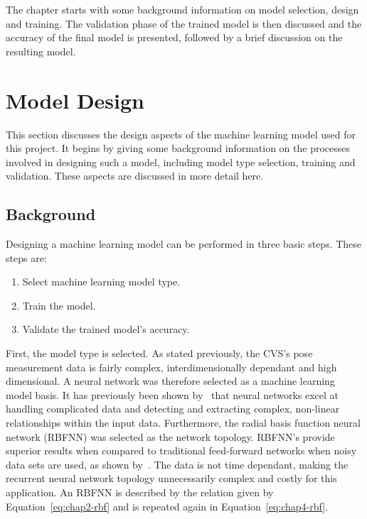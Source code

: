 The chapter starts with some background information on model selection, design and training. The validation phase of the trained model is then discussed and the accuracy of the final model is presented, followed by a brief discussion on the resulting model. 

\section{Model Design}

This section discusses the design aspects of the machine learning model used for this project. It begins by giving some background information on the processes involved in designing such a model, including model type selection, training and validation. These aspects are discussed in more detail here.  

\subsection{Background}

Designing a machine learning model can be performed in three basic steps. These steps are:

\begin{enumerate}
  \item Select machine learning model type.
  \item Train the model.
  \item Validate the trained model's accuracy. 
\end{enumerate}

First, the model type is selected. As stated previously, the CVS's pose measurement data is fairly complex, interdimensionally dependant and high dimensional. A neural network was therefore selected as a machine learning model basis. It has previously been shown by~\cite{tu1996advantages} that neural networks excel at handling complicated data and detecting and extracting complex, non-linear relationships within the input data. Furthermore, the radial basis function neural network (RBFNN) was selected as the network topology. RBFNN's provide superior results when compared to traditional feed-forward networks when noisy data sets are used, as shown by~\cite{xie2011comparison}. The data is not time dependant, making the recurrent neural network topology unnecessarily complex and costly for this application. An RBFNN is described by the relation given by Equation~\ref{eq:chap2-rbf} and is repeated again in Equation~\ref{eq:chap4-rbf}.


